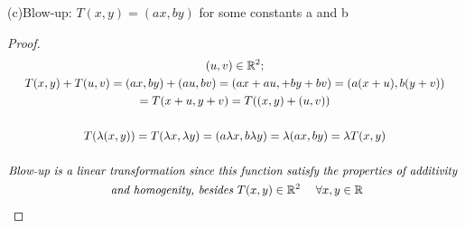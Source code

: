 \documentclass[10pt]{extarticle}
\newcommand{\reall}{\mathbb{R}}
\begin{document}
\begin{itemize}
			
		
		(c)Blow-up: $T(x,y)=(ax,by)$ for some constants a and b 
		
			\begin{proof}
				\begin{gather*}
					(u,v)\in \reall^2;
					\\
					T(x,y)+T(u,v)=(ax,by)+(au,bv)=(ax+au,+by+bv)=(a(x+u),b(y+v))
					\\=T(x+u,y+v)=T((x,y)+(u,v))
					\\
					\\
					T(\lambda(x,y))=T(\lambda x,\lambda y)=(a\lambda x,b\lambda y)=\lambda(ax,by)=\lambda T(x,y)
					\\
					\\
					\textit{Blow-up is a linear transformation since this function satisfy the properties of additivity
					}
					\\
					\textit{ and homogenity, besides  $ T(x,y) \in \reall^2 \; \quad \forall x,y\in \reall $}
				\end{gather*}
			\end{proof}
		
		
\clearpage	
		

\end{itemize}
\end{document}
